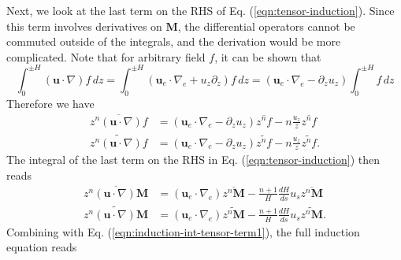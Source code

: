 Next, we look at the last term on the RHS of Eq. (\ref{eqn:tensor-induction}). Since this term involves derivatives on $\mathbf{M}$, the differential operators cannot be commuted outside of the integrals, and the derivation would be more complicated.
Note that for arbitrary field $f$, it can be shown that
\[
    \int_0^{\pm H} (\mathbf{u}\cdot \nabla) f\, dz = \int_0^{\pm H} (\mathbf{u}_e\cdot \nabla_e + u_z \partial_z) f\, dz = (\mathbf{u}_e\cdot \nabla_e - \partial_z u_z)\int_0^{\pm H} f\, dz
\]
Therefore we have
\[\begin{aligned}
    \overline{z^n (\mathbf{u}\cdot \nabla)f} &= (\mathbf{u}_e\cdot \nabla_e - \partial_z u_z) \overline{z^n f} - n \frac{u_z}{z} \overline{z^n f} \\ 
    \widetilde{z^n (\mathbf{u}\cdot \nabla)f} &= (\mathbf{u}_e\cdot \nabla_e - \partial_z u_z) \widetilde{z^n f} - n \frac{u_z}{z} \widetilde{z^n f}.
\end{aligned}\]
The integral of the last term on the RHS in Eq. (\ref{eqn:tensor-induction}) then reads
\begin{equation}\label{eqn:induction-int-tensor-term2}
\begin{aligned}
    \overline{z^n (\mathbf{u}\cdot \nabla)\mathbf{M}} &= (\mathbf{u}_e\cdot \nabla_e) \overline{z^n \mathbf{M}} - \frac{n+1}{H}\frac{dH}{ds} u_s \overline{z^n \mathbf{M}} \\ 
    \widetilde{z^n (\mathbf{u}\cdot \nabla)\mathbf{M}} &= (\mathbf{u}_e\cdot \nabla_e) \widetilde{z^n \mathbf{M}} - \frac{n+1}{H}\frac{dH}{ds}u_s \widetilde{z^n\mathbf{M}}.
\end{aligned}
\end{equation}
Combining with Eq. (\ref{eqn:induction-int-tensor-term1}), the full induction equation reads
